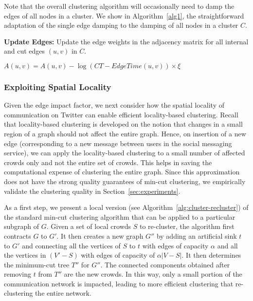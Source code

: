 \documentclass{sig-alternate}
\begin{document}
Note that the overall clustering algorithm will occasionally need to damp the edges of all nodes in a cluster. We show in Algorithm~\ref{alg1}, the straightforward adaptation of the single edge damping to the damping of all nodes in a cluster $C$.

\newcommand{\DampCluster}{\ensuremath{\mbox{\sc DampCluster}}}
\begin{algorithm}
\caption{$\DampCluster(C)$}\label{alg:cluster-damp}
\begin{algorithmic}
\STATE \textbf{Update Edges:} Update the edge weights in the
adjacency matrix for all internal and cut edges $(u,v)$ in $C$.
\begin{center}
$A(u, v) = A(u, v)- \log(CT - EdgeTime(u, v))\times \xi$
\end{center}
\end{algorithmic}
\label{alg1}
\end{algorithm}



\subsubsection{Exploiting Spatial Locality}
Given the edge impact factor, we next consider how the spatial locality of communication on Twitter can enable efficient locality-based clustering. Recall that locality-based clustering is developed on the notion that changes in
 a small region of a graph should not affect the entire graph. Hence, on
 insertion of a new edge (corresponding to a new message between users in the social
 messaging service), we can apply the locality-based clustering to a small number of
 affected crowds only and not the entire set of crowds. This helps in saving the
 computational expense of clustering the entire graph.  Since
 this approximation does not have the strong quality guarantees of min-cut
 clustering, we empirically validate the clustering quality
in Section~\ref{sec:experiments}.

As a first step, we present a local version (see Algorithm~\ref{alg:cluster-recluster}) of the standard min-cut clustering algorithm that can be applied to a particular subgraph of $G$. Given a set of local crowds $S$ to re-cluster, the algorithm first contracts $G$ to $G'$. It then creates a new graph $G''$ by adding an artificial sink $t$ to $G'$ and connecting all the vertices of $S$ to $t$ with edges of capacity $\alpha$ and all the vertices in $(V'-S)$ with edges of capacity of $\alpha|V-S|$. It then determines the minimum-cut tree $T''$ for $G''$. The connected components obtained after removing $t$ from $T''$ are the new crowds. In this way, only a small portion of the communication network is impacted, leading to more efficient clustering that re-clustering the entire network.
\end{document}
